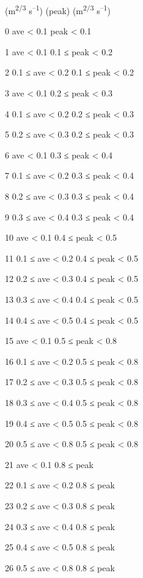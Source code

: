 (m\textsuperscript{2/3} s\textsuperscript{--1}) (peak) (m\textsuperscript{2/3} s\textsuperscript{--1})

0 ave \textless{} 0.1 peak \textless{} 0.1

1 ave \textless{} 0.1 0.1 ≤ peak \textless{} 0.2

2 0.1 ≤ ave \textless{} 0.2 0.1 ≤ peak \textless{} 0.2

3 ave \textless{} 0.1 0.2 ≤ peak \textless{} 0.3

4 0.1 ≤ ave \textless{} 0.2 0.2 ≤ peak \textless{} 0.3

5 0.2 ≤ ave \textless{} 0.3 0.2 ≤ peak \textless{} 0.3

6 ave \textless{} 0.1 0.3 ≤ peak \textless{} 0.4

7 0.1 ≤ ave \textless{} 0.2 0.3 ≤ peak \textless{} 0.4

8 0.2 ≤ ave \textless{} 0.3 0.3 ≤ peak \textless{} 0.4

9 0.3 ≤ ave \textless{} 0.4 0.3 ≤ peak \textless{} 0.4

10 ave \textless{} 0.1 0.4 ≤ peak \textless{} 0.5

11 0.1 ≤ ave \textless{} 0.2 0.4 ≤ peak \textless{} 0.5

12 0.2 ≤ ave \textless{} 0.3 0.4 ≤ peak \textless{} 0.5

13 0.3 ≤ ave \textless{} 0.4 0.4 ≤ peak \textless{} 0.5

14 0.4 ≤ ave \textless{} 0.5 0.4 ≤ peak \textless{} 0.5

15 ave \textless{} 0.1 0.5 ≤ peak \textless{} 0.8

16 0.1 ≤ ave \textless{} 0.2 0.5 ≤ peak \textless{} 0.8

17 0.2 ≤ ave \textless{} 0.3 0.5 ≤ peak \textless{} 0.8

18 0.3 ≤ ave \textless{} 0.4 0.5 ≤ peak \textless{} 0.8

19 0.4 ≤ ave \textless{} 0.5 0.5 ≤ peak \textless{} 0.8

20 0.5 ≤ ave \textless{} 0.8 0.5 ≤ peak \textless{} 0.8

21 ave \textless{} 0.1 0.8 ≤ peak

22 0.1 ≤ ave \textless{} 0.2 0.8 ≤ peak

23 0.2 ≤ ave \textless{} 0.3 0.8 ≤ peak

24 0.3 ≤ ave \textless{} 0.4 0.8 ≤ peak

25 0.4 ≤ ave \textless{} 0.5 0.8 ≤ peak

26 0.5 ≤ ave \textless{} 0.8 0.8 ≤ peak

